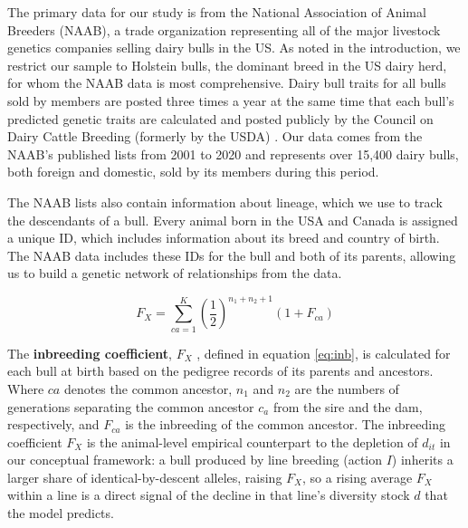 \documentclass[12pt,letterpaper]{article}
\begin{document}
The primary data for our study is from the National Association of Animal Breeders (NAAB), a trade organization representing all of the major livestock genetics companies selling dairy bulls in the US. As noted in the introduction, we restrict our sample to Holstein bulls, the dominant breed in the US dairy herd, for whom the NAAB data is most comprehensive. Dairy bull traits for all bulls sold by members are posted three times a year at the same time that each bull's predicted genetic traits are calculated and posted publicly by the Council on Dairy Cattle Breeding (formerly by the USDA) \citep{Hutchins_Hueth2023}. Our data comes from the NAAB's published lists from 2001 to 2020 and represents over 15,400 dairy bulls, both foreign and domestic, sold by its members during this period. %


The NAAB lists also contain information about lineage, which we use to track the descendants of a bull. Every animal born in the USA and Canada is assigned a unique ID, which includes information about its breed and country of birth. 
The NAAB data includes these IDs for the bull and both of its parents, allowing us to build a genetic network of relationships from the data. 

\begin{equation}
        F_{X}=\sum_{ca=1}^{K}\left(\dfrac{1}{2}\right)^{n_{1}+n_{2}+1}(1+F_{ca})\label{eq:inb}
\end{equation}

The \textbf{inbreeding coefficient}, $F_{X}$ \citep{Wright1922}, defined in equation \ref{eq:inb}, is calculated for each bull at birth based on the pedigree records of its parents and ancestors. Where $ca$ denotes the common ancestor, $n_{1}$ and $n_{2}$ are the numbers of generations separating the common ancestor $c_a$ from the sire and the dam, respectively, and $F_{ca}$ is the inbreeding of the common ancestor. The inbreeding coefficient $F_{X}$ is the animal-level empirical counterpart to the depletion of $d_{it}$ in our conceptual framework: a bull produced by line breeding (action $I$) inherits a larger share of identical-by-descent alleles, raising $F_{X}$, so a rising average $F_{X}$ within a line is a direct signal of the decline in that line's diversity stock $d$ that the model predicts.
\end{document}
